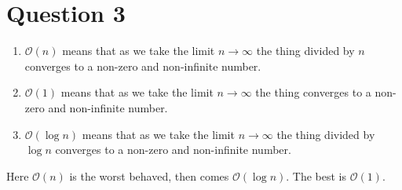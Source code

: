 \documentclass[a4paper,10pt]{article}
\begin{document}
\section*{Question 3}
\begin{enumerate}
 \item $\mathcal{O}(n)$ means that as we take the limit $n\to \infty$ the thing divided by $n$ converges to a non-zero and non-infinite number.
 \item  $\mathcal{O}(1)$ means that as we take the limit $n\to \infty$ the thing converges to a non-zero and non-infinite number.
 \item $\mathcal{O}(\log n)$ means that as we take the limit $n\to \infty$ the thing divided by $\log n$ converges to a non-zero and non-infinite number.
\end{enumerate}

Here  $\mathcal{O}(n)$ is the worst behaved, then comes $\mathcal{O}(\log n)$. The best is $\mathcal{O}(1)$.
\end{document}
